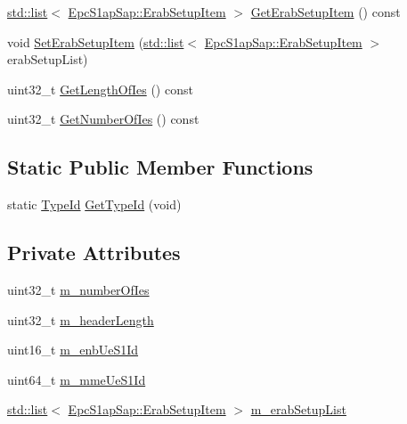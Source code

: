 \begin{DoxyCompactItemize}
\item 
\hyperlink{openflow-interface_8h_afd9bcfa176617760671b67580f536fa7}{std\+::list}$<$ \hyperlink{structns3_1_1EpcS1apSap_1_1ErabSetupItem}{Epc\+S1ap\+Sap\+::\+Erab\+Setup\+Item} $>$ \hyperlink{classns3_1_1EpcS1APInitialContextSetupResponseHeader_ad45a82df388474229fd2abe724b6f376}{Get\+Erab\+Setup\+Item} () const 
\item 
void \hyperlink{classns3_1_1EpcS1APInitialContextSetupResponseHeader_a62fed8637a62ed5b1babdac0bf07b0d8}{Set\+Erab\+Setup\+Item} (\hyperlink{openflow-interface_8h_afd9bcfa176617760671b67580f536fa7}{std\+::list}$<$ \hyperlink{structns3_1_1EpcS1apSap_1_1ErabSetupItem}{Epc\+S1ap\+Sap\+::\+Erab\+Setup\+Item} $>$ erab\+Setup\+List)
\item 
uint32\+\_\+t \hyperlink{classns3_1_1EpcS1APInitialContextSetupResponseHeader_ab207add9e60a81d4ec80dbe874311934}{Get\+Length\+Of\+Ies} () const 
\item 
uint32\+\_\+t \hyperlink{classns3_1_1EpcS1APInitialContextSetupResponseHeader_aca612ba4ffed6f2e029f3028edc6bc85}{Get\+Number\+Of\+Ies} () const 
\end{DoxyCompactItemize}
\subsection*{Static Public Member Functions}
\begin{DoxyCompactItemize}
\item 
static \hyperlink{classns3_1_1TypeId}{Type\+Id} \hyperlink{classns3_1_1EpcS1APInitialContextSetupResponseHeader_a70a20a9f8f58dd573a618a2d0daf8d7c}{Get\+Type\+Id} (void)
\end{DoxyCompactItemize}
\subsection*{Private Attributes}
\begin{DoxyCompactItemize}
\item 
uint32\+\_\+t \hyperlink{classns3_1_1EpcS1APInitialContextSetupResponseHeader_ac173d56839c2071d3b246e4b2a9fb8f2}{m\+\_\+number\+Of\+Ies}
\item 
uint32\+\_\+t \hyperlink{classns3_1_1EpcS1APInitialContextSetupResponseHeader_aaffeeaa6341a669f5fdacf5f121488fa}{m\+\_\+header\+Length}
\item 
uint16\+\_\+t \hyperlink{classns3_1_1EpcS1APInitialContextSetupResponseHeader_a25eeb666c4dcacb8233d935752d5d359}{m\+\_\+enb\+Ue\+S1\+Id}
\item 
uint64\+\_\+t \hyperlink{classns3_1_1EpcS1APInitialContextSetupResponseHeader_abe6b8ad648a51caea3869046a89998be}{m\+\_\+mme\+Ue\+S1\+Id}
\item 
\hyperlink{openflow-interface_8h_afd9bcfa176617760671b67580f536fa7}{std\+::list}$<$ \hyperlink{structns3_1_1EpcS1apSap_1_1ErabSetupItem}{Epc\+S1ap\+Sap\+::\+Erab\+Setup\+Item} $>$ \hyperlink{classns3_1_1EpcS1APInitialContextSetupResponseHeader_a92b6da6866cb4379178a9542e788d787}{m\+\_\+erab\+Setup\+List}
\end{DoxyCompactItemize}
